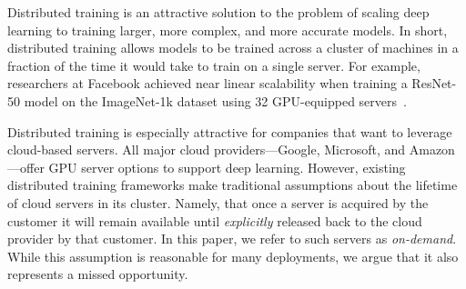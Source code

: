 %
%

Distributed training is an attractive solution to the problem of scaling deep
learning to training larger, more complex, and more accurate models. In short,
distributed training allows models to be trained across a cluster of machines
in a fraction of the time it would take to train on a single server. For
example, researchers at Facebook achieved near linear scalability when training
a ResNet-50 model on the ImageNet-1k dataset using 32 GPU-equipped
servers~\cite{goyal2017accurate}.

Distributed training is especially attractive for companies that want to
leverage cloud-based servers.  All major cloud providers---Google, Microsoft,
and Amazon---offer GPU server options to support deep learning.  However,
existing distributed training frameworks make traditional assumptions about the
lifetime of cloud servers in its cluster. Namely, that once a server is
acquired by the customer it will remain available until \emph{explicitly} released
back to the cloud provider by that customer. In this paper, we refer to such
servers as \emph{on-demand}. While this assumption is reasonable for many
deployments, we argue that it also represents a missed opportunity.   

